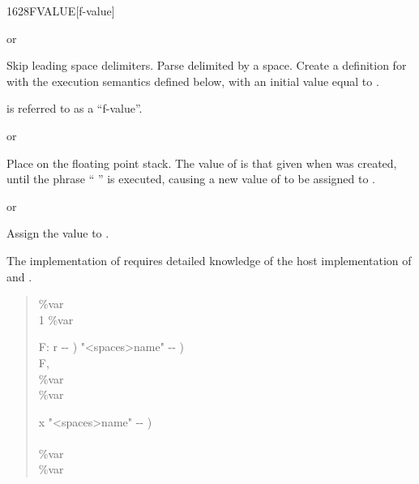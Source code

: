\vspace*{-2.5ex}
\begin{worddef}{1628}{FVALUE}[f-value]%
\item {}  or

	Skip leading space delimiters.  Parse  delimited by a
	space.  Create a definition for  with the execution
	semantics defined below, with an initial value equal to .

	 is referred to as a ``f-value''.

\execute[name]
	 or 

	Place  on the floating point stack.  The value of
	 is that given when  was created, until the
	phrase ``  '' is executed, causing
	a new value of  to be assigned to .

	 or 

	Assign the value  to .


	\begin{implement} %
		\dffamily
		The implementation of  requires detailed
		knowledge of the host implementation of  and
		.

		\begin{quote}\ttfamily
			 \%var \\
			\word{:}  1 \%var \word{!} \word{;}

			\word{:}   F: r -{}- )  "<spaces>name" -{}- ) \\
			\tab {} F, \\
			\tab {} \%var       \\
			 \%var \word{!} \word{;}

			\word{:}   x "<spaces>name" -{}- ) \\
			\tab {} \word{,} \\
			\tab {} \%var   ~\word{!}  ~  \\
			 \%var \word{!} \word{;}
		\end{quote}
	\end{implement}


\end{worddef}
